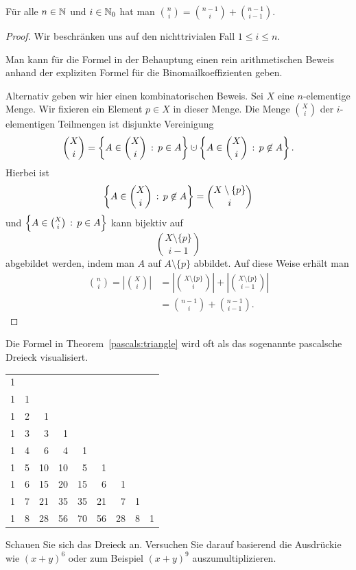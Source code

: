 \begin{thm} \label{pascals:triangle} 
	Für alle $n \in \mathbb{N}$ und $i \in \mathbb{N}_0$ hat man $\binom{n}{i}  = \binom{n-1}{i}  + \binom{n-1}{i-1}$. 
\end{thm} 
\begin{proof} 
	Wir beschränken uns auf den nichttrivialen Fall $1 \le i \le n$. 
	
	Man kann für die Formel in der Behauptung einen rein arithmetischen Beweis anhand der expliziten Formel für die Binomailkoeffizienten geben. 
	
	Alternativ geben wir hier einen kombinatorischen Beweis. Sei $X$ eine $n$-elementige Menge. Wir fixieren ein Element $p\in X$ in dieser Menge. Die Menge $\binom{X}{i}$ der $i$-elementigen Teilmengen ist disjunkte Vereinigung 
	\[
		\binom{X}{i} = \setcond{ A \in \binom{X}{i}}{p \in A} \cupdot \setcond{A \in \binom{X}{i}}{p \not\in A}. 
	\]
	Hierbei ist 
	\[
			\left\{ A \in \binom{X}{i} \,:\, p \not\in A \right\} = \binom{X \setminus \{p\}}{i}
	\]
	und $\left\{  A \in \binom{X}{i} \,:\, p \in A \right\}$ kann bijektiv auf 
	\[
			\binom{X \setminus \{p\}}{i-1}
	\]
	abgebildet werden, indem man $A$ auf $A \setminus \{p\}$ abbildet. Auf diese Weise erhält man 
	\begin{align*}
		\binom{n}{i} = \left| \binom{X}{i} \right| & = \left| \binom{X \setminus \{p\}}{i} \right| + \left| \binom{X \setminus \{p\}}{i-1}\right| 
		\\ & = \binom{n-1}{i} + \binom{n-1}{i-1}. 
	\end{align*} 
\end{proof} 

\begin{aufg}
	Die Formel in Theorem~\ref{pascals:triangle} wird oft als das sogenannte pascalsche Dreieck visualisiert. 
	\begin{center}
	\begin{tabular}{rrrrrrrrr}
1\\
1 & 1\\
1 & 2 & 1\\
1 & 3 & 3 & 1\\
1 & 4 & 6 & 4 & 1\\
1 & 5 & 10 & 10 & 5 & 1\\
1 & 6 & 15 & 20 & 15 & 6 & 1\\
1 & 7 & 21 & 35 & 35 & 21 & 7 & 1\\
1 & 8 & 28 & 56 & 70 & 56 & 28 & 8 & 1
	\end{tabular}
\end{center}
Schauen Sie sich das Dreieck an. Versuchen Sie darauf basierend die Ausdrückie wie $(x+y)^6$ oder zum Beispiel $(x+y)^9$ auszumultiplizieren. 
\end{aufg} 

